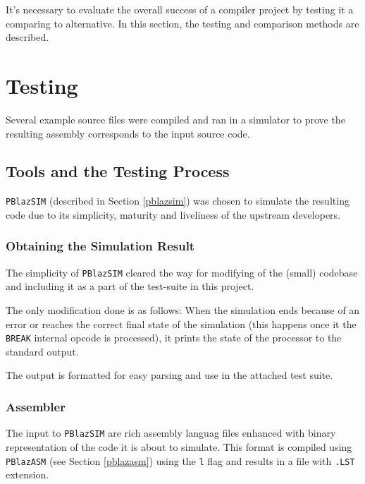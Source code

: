 It's necessary to evaluate the overall success of a compiler project by testing it a comparing to alternative. In this section, the testing and comparison methods are described.

    \section{Testing}\label{testing}
 
    Several example source files were compiled and ran in a simulator to prove the resulting assembly corresponds to the input source code.

        \subsection{Tools and the Testing Process}

        \texttt{PBlazSIM} (described in Section \ref{pblazsim}) was chosen to simulate the resulting code due to its simplicity, maturity and liveliness of the upstream developers.

            \subsubsection{Obtaining the Simulation Result}

                The simplicity of \texttt{PBlazSIM} cleared the way for modifying of the (small) codebase and including it as a part of the test-suite in this project.

                The only modification done is as follows: When the simulation ends because of an error or reaches the correct final state of the simulation (this happens once it  the \texttt{BREAK} internal opcode is processed), it prints the state of the processor to the standard output.

                The output is formatted for easy parsing and use in the attached test suite.

            \subsubsection{Assembler}

                The input to \texttt{PBlazSIM} are rich assembly languag files enhanced with binary representation of the code it is about to simulate. This format is compiled using \texttt{PBlazASM} (see Section \ref{pblazasm}) using the \texttt{\-l} flag and results in a file with \texttt{.LST} extension.

